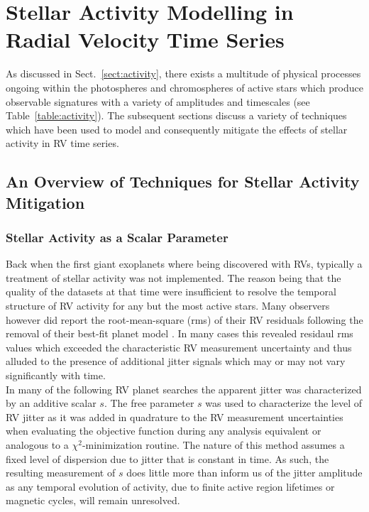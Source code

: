 \chapter{Stellar Activity Modelling in Radial Velocity Time Series}
As discussed in Sect.~\ref{sect:activity}, there exists a multitude of physical
processes ongoing within the photospheres and chromospheres of active stars
which produce observable signatures with a variety of amplitudes and timescales
(see Table~\ref{table:activity}). The subsequent sections discuss a variety of
techniques which have been used to model and consequently mitigate the effects of
stellar activity in RV time series.

\section{An Overview of Techniques for Stellar Activity Mitigation}
\label{sect:methods}

\subsection{Stellar Activity as a Scalar Parameter}
Back when the first giant exoplanets where being discovered with RVs,
typically a treatment of stellar activity was not implemented. The reason being
that the quality of the datasets at that time were insufficient to resolve the
temporal structure of RV activity for any but the most active stars. Many
observers however did report the root-mean-square (rms) of their RV residuals
following the removal of their best-fit planet model
\citep[e.g.][]{mayor95,butler96}. In
many cases this revealed residaul rms values which exceeded the characteristic RV
measurement uncertainty and thus alluded to the presence of additional
jitter signals which may or may not vary significantly with time. \\

In many of the following RV planet searches the apparent jitter was characterized
by an additive scalar $s$. The free parameter $s$ was used to characterize the
level of RV jitter as it was added in quadrature to the RV measurement
uncertainties when evaluating the objective function during any analysis
equivalent or analogous to a $\chi^2$-minimization routine. The nature of this
method assumes a fixed level of dispersion due to jitter that is constant in time.
As such, the resulting
measurement of $s$ does little more than inform us of the jitter amplitude as
any temporal evolution of activity, due to finite active region lifetimes or magnetic
cycles, will remain unresolved.

